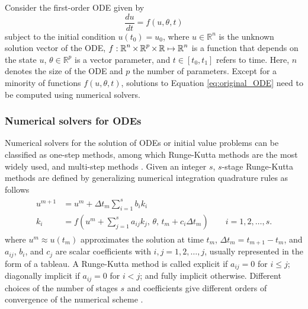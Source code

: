 Consider the first-order ODE given by
\begin{equation}
 \frac{du}{dt} = f(u, \theta, t)
 \label{eq:original_ODE}
\end{equation}
subject to the initial condition $u(t_0) = u_0$, where $u \in \mathbb{R}^n$ is the unknown solution vector of the ODE, $f: \operatorname{\mathbb{R}}^n \times \operatorname{\mathbb{R}}^p \times \operatorname{\mathbb{R}} \mapsto \operatorname{\mathbb{R}}^n$ is a function that depends on the state $u$, $\theta \in \mathbb R^p$ is a vector parameter, and $t \in [t_0, t_1]$ refers to time.
Here, $n$ denotes the size of the ODE and $p$ the number of parameters.
Except for a minority of functions $f(u,\theta, t)$, solutions to Equation \eqref{eq:original_ODE} need to be computed using numerical solvers. 

\subsubsection{Numerical solvers for ODEs}
\label{section:intro-numerical-solvers}

Numerical solvers for the solution of ODEs or initial value problems can be classified as one-step methods, among which Runge-Kutta methods are the most widely used, and multi-step methods \cite{hairer-solving-1}.
Given an integer $s$, $s$-stage Runge-Kutta methods are defined by generalizing numerical integration quadrature rules as follows
\begin{align}
\begin{split}
    u^{m+1} 
    &= 
    u^m 
    + 
    \Delta t_m \sum_{i=1}^s b_i k_i \\
    k_i 
    &= 
    f \left(u^m + \sum_{j=1}^s a_{ij} k_j , \, \theta , \, t_m + c_i \Delta t_m \right) \qquad i=1,2, \ldots, s.
    \label{eq:Runge-Kutta-scheme}
\end{split}
\end{align}
where $u^{m} \approx u(t_m)$ approximates the solution at time $t_m$, $\Delta t_m = t_{m+1}-t_m$, and $a_{ij}$, $b_i$, and $c_j$ are scalar coefficients with $i,j=1, 2,\ldots, j$, usually represented in the form of a tableau. 
A Runge-Kutta method is called explicit if $a_{ij}=0$ for $i \leq j$; diagonally implicit if $a_{ij}=0$ for $i < j$; and fully implicit otherwise. 
Different choices of the number of stages $s$ and coefficients give different orders of convergence of the numerical scheme \cite{Butcher_Wanner_1996, Butcher_2001}. 

